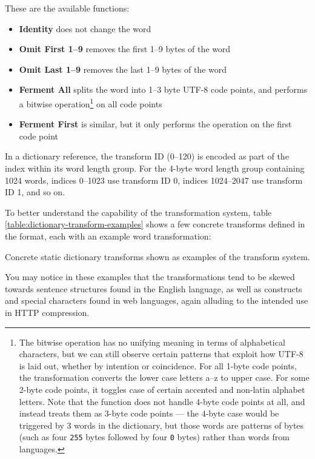 \documentclass[english,master,dept460,male,cpp,cpdeclaration]{diploma}
\newcommand{\nosep}{\itemsep0em}
\newcommand{\texfigure}[1]{
}
\begin{document}
		These are the available functions:
		
		\begin{itemize} \nosep
			\item \textbf{Identity} does not change the word
			\item \textbf{Omit First 1--9} removes the first 1--9 bytes of the word
			\item \textbf{Omit Last 1--9} removes the last 1--9 bytes of the word
			\item \textbf{Ferment All} splits the word into 1--3 byte UTF-8 code points, and performs a bitwise operation\footnote{The bitwise operation has no unifying meaning in terms of alphabetical characters, but we can still observe certain patterns that exploit how UTF-8 is laid out, whether by intention or coincidence. For all 1-byte code points, the transformation converts the lower case letters a--z to upper case. For some 2-byte code points, it toggles case of certain accented and non-latin alphabet letters. Note that the function does not handle 4-byte code points at all, and instead treats them as 3-byte code points --- the 4-byte case would be triggered by 3 words in the dictionary, but those words are patterns of bytes (such as four \texttt{255} bytes followed by four \texttt{0} bytes) rather than words from languages.} on all code points
			\item \textbf{Ferment First} is similar, but it only performs the operation on the first code point
		\end{itemize}
		
		\noindent
		In a dictionary reference, the transform ID (0--120) is encoded as part of the index within its word length group. For the 4-byte word length group containing 1024 words, indices 0--1023 use transform ID 0, indices 1024--2047 use transform ID 1, and so on.
		
		To better understand the capability of the transformation system, table \ref{table:dictionary-transform-examples} shows a few concrete transforms defined in the format, each with an example word transformation:
		
		\begin{table}[H]
			\centering
			\smallskip
			\caption{Concrete static dictionary transforms shown as examples of the transform system.}
			\label{table:dictionary-transform-examples}
			\texfigure{dictionary-transform-examples}
		\end{table}
		
		\noindent
		You may notice in these examples that the transformations tend to be skewed towards sentence structures found in the English language, as well as constructs and special characters found in web languages, again alluding to the intended use in HTTP compression.
	
\end{document}
